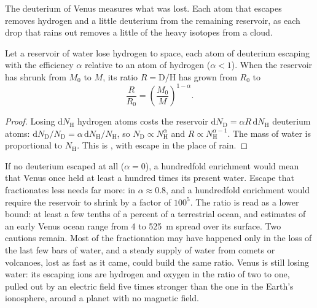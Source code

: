 The deuterium of Venus measures what was lost. Each atom that escapes
removes hydrogen and a little deuterium from the remaining reservoir, as
each drop that rains out removes a little of the heavy isotopes from a
cloud.

\begin{proposition}\label{prop:b3:planetary-atmospheres:dh}
Let a reservoir of water lose hydrogen to space, each atom of deuterium
escaping with the efficiency $\alpha$ relative to an atom of hydrogen
($\alpha < 1$). When the reservoir has shrunk from $M_0$ to $M$, its ratio
$R = \mathrm{D}/\mathrm{H}$ has grown from $R_0$ to
\[
\frac R{R_0} = \left(\frac{M_0}M\right)^{1-\alpha}.
\]
\end{proposition}

\begin{proof}
Losing $\mathrm dN_\mathrm H$ hydrogen atoms costs the reservoir
$\mathrm dN_\mathrm D = \alpha R\,\mathrm dN_\mathrm H$ deuterium atoms:
$\mathrm dN_\mathrm D/N_\mathrm D = \alpha\,\mathrm dN_\mathrm H/
N_\mathrm H$, so $N_\mathrm D \propto N_\mathrm H^\alpha$ and $R \propto
N_\mathrm H^{\alpha - 1}$. The mass of water is proportional to
$N_\mathrm H$. This is , with escape in the place of
rain.
\end{proof}

If no deuterium escaped at all ($\alpha = 0$), a hundredfold enrichment
would mean that Venus once held at least a hundred times its present
water. Escape that fractionates less needs far more: in  $\alpha \approx 0.8$, and a hundredfold enrichment would require
the reservoir to shrink by a factor of $100^5$. The ratio is read as a
lower bound: at least a few tenths of a percent of a terrestrial ocean,
and estimates of an early Venus ocean range from 4 to \qty{525}{m} spread
over its surface. Two cautions remain. Most of the fractionation may have
happened only in the loss of the last few bars of water, and a steady
supply of water from comets or volcanoes, lost as fast as it came, could
build the same ratio. Venus is still losing water: its escaping ions are
hydrogen and oxygen in the ratio of two to one, pulled out by an electric
field five times stronger than the one in the Earth's ionosphere, around a
planet with no magnetic field.

